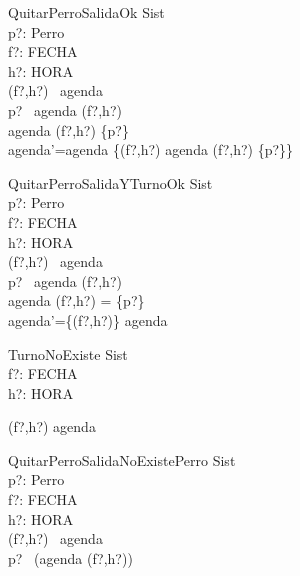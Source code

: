 \documentclass[12pt,zed]{article}
\begin{document}
\begin{schema}{QuitarPerroSalidaOk}
\Delta Sist \\
p?: Perro \\
f?: FECHA \\
h?: HORA \\
\where
(f?,h?) \in \dom \ agenda \\

p? \in \ agenda (f?,h?) \\
agenda (f?,h?) \neq \{p?\} \\


agenda'=agenda \oplus \{(f?,h?) \mapsto agenda (f?,h?) \setminus \{p?\}\} \\

\end{schema}

\begin{schema}{QuitarPerroSalidaYTurnoOk}
\Delta Sist \\
p?: Perro \\
f?: FECHA \\
h?: HORA \\
\where
(f?,h?) \in \dom \ agenda \\

p? \in \ agenda (f?,h?) \\
agenda (f?,h?) = \{p?\} \\


agenda'=\{(f?,h?)\} \ndres agenda \\

\end{schema}

\begin{schema}{TurnoNoExiste}
\Xi Sist \\
f?: FECHA \\
h?: HORA \\
\where

(f?,h?) \notin \dom agenda \\
\end{schema}

\begin{schema}{QuitarPerroSalidaNoExistePerro}
\Xi Sist \\
p?: Perro \\
f?: FECHA \\
h?: HORA \\
\where
(f?,h?) \in \dom \ agenda \\
p? \notin \ (agenda (f?,h?)) \\
\end{schema}
\end{document}
